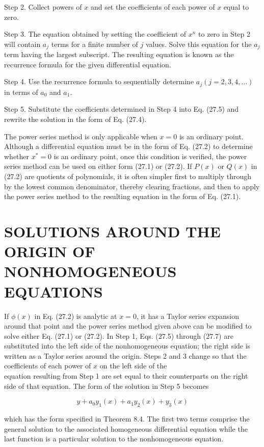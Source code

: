 \documentclass[10pt]{article}
\begin{document}
Step 2. Collect powers of $x$ and set the coefficients of each power of $x$ equal to zero.

Step 3. The equation obtained by setting the coefficient of $x^{n}$ to zero in Step 2 will contain $a_{j}$ terms for a finite number of $j$ values. Solve this equation for the $a_{j}$ term having the largest subscript. The resulting equation is known as the recurrence formula for the given differential equation.

Step 4. Use the recurrence formula to sequentially determine $a_{j}(j=2,3,4, \ldots)$ in terms of $a_{0}$ and $a_{1}$.

Step 5. Substitute the coefficients determined in Step 4 into Eq. (27.5) and rewrite the solution in the form of Eq. (27.4).

The power series method is only applicable when $x=0$ is an ordinary point. Although a differential equation must be in the form of Eq. (27.2) to determine whether $x^{*}=0$ is an ordinary point, once this condition is verified, the power series method can be used on either form (27.1) or (27.2). If $P(x)$ or $Q(x)$ in (27.2) are quotients of polynomials, it is often simpler first to multiply through by the lowest common denominator, thereby clearing fractions, and then to apply the power series method to the resulting equation in the form of Eq. (27.1).

\section*{SOLUTIONS AROUND THE ORIGIN OF NONHOMOGENEOUS EQUATIONS}
If $\phi(x)$ in Eq. (27.2) is analytic at $x=0$, it has a Taylor series expansion around that point and the power series method given above can be modified to solve either Eq. (27.1) or (27.2). In Step 1, Eqs. (27.5) through (27.7) are substituted into the left side of the nonhomogeneous equation; the right side is written as a Taylor series around the origin. Steps 2 and 3 change so that the coefficients of each power of $x$ on the left side of the\\
equation resulting from Step 1 are set equal to their counterparts on the right side of that equation. The form of the solution in Step 5 becomes

$$
y+a_{0} y_{1}(x)+a_{1} y_{2}(x)+y_{3}(x)
$$

which has the form specified in Theorem 8.4. The first two terms comprise the general solution to the associated homogeneous differential equation while the last function is a particular solution to the nonhomogeneous equation.
\end{document}
